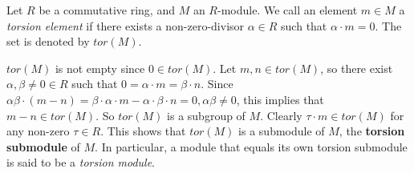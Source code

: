 \documentclass[12pt]{article}
\begin{document}
Let $R$ be a commutative ring, and $M$ an $R$-module. We call an element $m\in M$ a \emph{torsion element} if there exists a non-zero-divisor $\alpha \in R$ such that $\alpha\cdot m=0$. The set is denoted by $tor(M)$.

$tor(M)$ is not empty since $0 \in tor(M)$. Let $m, n \in tor(M)$, so there exist $\alpha, \beta \ne 0 \in R$ such that $0=\alpha\cdot m=\beta\cdot n$. Since $\alpha\beta \cdot (m-n)=\beta\cdot \alpha\cdot m -\alpha\cdot \beta\cdot n=0, \alpha\beta\ne 0$, this implies that $m-n \in tor(M)$. So $tor(M)$ is a subgroup of $M$. Clearly $\tau\cdot m \in tor(M)$ for any non-zero $\tau \in R$. This shows that $tor(M)$ is a submodule of $M$, the \textbf{torsion submodule} of $M$.  In particular, a module that equals its own torsion submodule is said to be a \emph{torsion module}.
\end{document}
